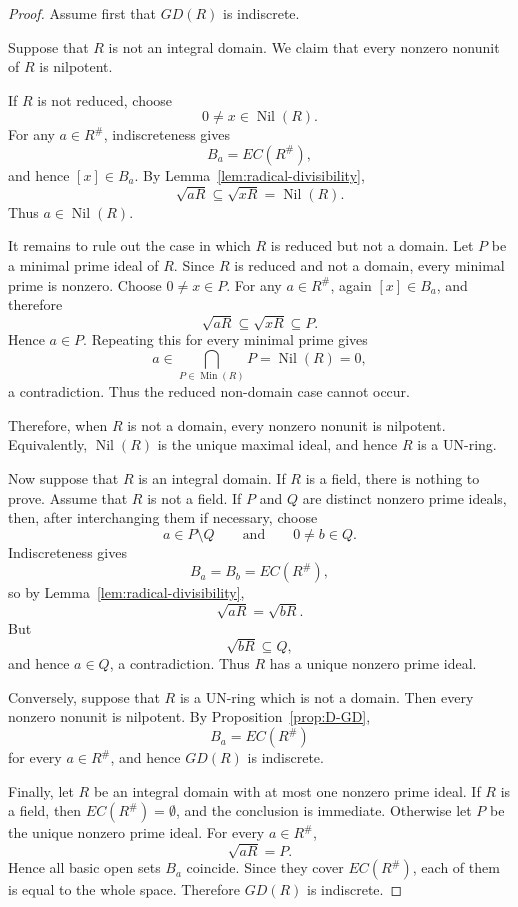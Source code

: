 \documentclass[11pt]{amsart}
\theoremstyle{plain}
\theoremstyle{definition}
\theoremstyle{remark}
\numberwithin{equation}{section}
\begin{document}
\begin{proof}
	Assume first that $GD(R)$ is indiscrete.
	
	Suppose that $R$ is not an integral domain. We claim that every
	nonzero nonunit of $R$ is nilpotent.
	
	If $R$ is not reduced, choose
	\[
	0\neq x\in\operatorname{Nil}(R).
	\]
	For any $a\in R^\#$, indiscreteness gives
	\[
	B_a=EC(R^\#),
	\]
	and hence $[x]\in B_a$. By Lemma~\ref{lem:radical-divisibility},
	\[
	\sqrt{aR}\subseteq\sqrt{xR}
	=
	\operatorname{Nil}(R).
	\]
	Thus $a\in\operatorname{Nil}(R)$.
	
	It remains to rule out the case in which $R$ is reduced but not a
	domain. Let $P$ be a minimal prime ideal of $R$. Since $R$ is reduced
	and not a domain, every minimal prime is nonzero. Choose
	$0\neq x\in P$. For any $a\in R^\#$, again $[x]\in B_a$, and therefore
	\[
	\sqrt{aR}\subseteq\sqrt{xR}\subseteq P.
	\]
	Hence $a\in P$. Repeating this for every minimal prime gives
	\[
	a\in\bigcap_{P\in\operatorname{Min}(R)}P
	=
	\operatorname{Nil}(R)=0,
	\]
	a contradiction. Thus the reduced non-domain case cannot occur.
	
	Therefore, when $R$ is not a domain, every nonzero nonunit is nilpotent.
	Equivalently, $\operatorname{Nil}(R)$ is the unique maximal ideal, and
	hence $R$ is a UN-ring.
	
	Now suppose that $R$ is an integral domain. If $R$ is a field, there is
	nothing to prove. Assume that $R$ is not a field. If $P$ and $Q$ are
	distinct nonzero prime ideals, then, after interchanging them if
	necessary, choose
	\[
	a\in P\setminus Q
	\qquad\text{and}\qquad
	0\neq b\in Q.
	\]
	Indiscreteness gives
	\[
	B_a=B_b=EC(R^\#),
	\]
	so by Lemma~\ref{lem:radical-divisibility},
	\[
	\sqrt{aR}=\sqrt{bR}.
	\]
	But
	\[
	\sqrt{bR}\subseteq Q,
	\]
	and hence $a\in Q$, a contradiction. Thus $R$ has a unique nonzero
	prime ideal.
	
	Conversely, suppose that $R$ is a UN-ring which is not a domain. Then
	every nonzero nonunit is nilpotent. By
	Proposition~\ref{prop:D-GD},
	\[
	B_a=EC(R^\#)
	\]
	for every $a\in R^\#$, and hence $GD(R)$ is indiscrete.
	
	Finally, let $R$ be an integral domain with at most one nonzero prime
	ideal. If $R$ is a field, then $EC(R^\#)=\emptyset$, and the conclusion
	is immediate. Otherwise let $P$ be the unique nonzero prime ideal. For
	every $a\in R^\#$,
	\[
	\sqrt{aR}=P.
	\]
	Hence all basic open sets $B_a$ coincide. Since they cover
	$EC(R^\#)$, each of them is equal to the whole space. Therefore
	$GD(R)$ is indiscrete.
\end{proof}
\end{document}
